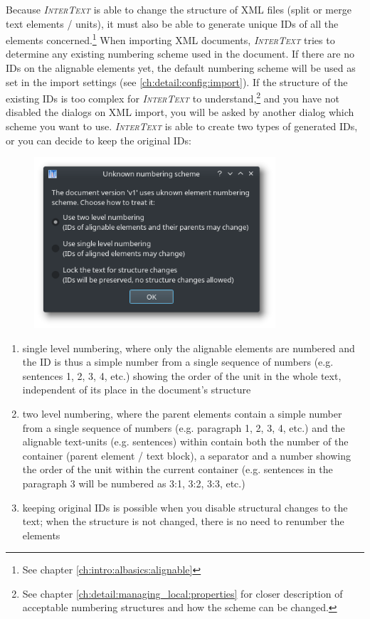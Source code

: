 \documentclass[a4paper,10pt,oneside]{book}
\newcommand{\IT}{\textit{\textsc{InterText}}\xspace}
\begin{document}
Because \IT is able to change the structure of XML files (split or merge text elements / units), it must also be able to generate unique IDs of all the elements concerned.\footnote{See chapter \ref{ch:intro:albasics:alignable}} When importing XML documents, \IT tries to determine any existing numbering scheme used in the document. If there are no IDs on the alignable elements yet, the default numbering scheme will be used as set in the import settings (see \ref{ch:detail:config:import}). If the structure of the existing IDs is too complex for \IT to understand,\footnote{See chapter \ref{ch:detail:managing_local:properties} for closer description of acceptable numbering structures and how the scheme can be changed.} and you have not disabled the dialogs on XML import, you will be asked by another dialog which scheme you want to use. \IT is able to create two types of generated IDs, or you can decide to keep the original IDs:

\begin{figure}[htb]
 \includegraphics[width=0.8\textwidth]{screenshots/numbering_dialog.png}
\end{figure}

\begin{enumerate}
 \item single level numbering, where only the alignable elements are numbered and the ID is thus a simple number from a single sequence of numbers (e.g. sentences 1, 2, 3, 4, etc.) showing the order of the unit in the whole text, independent of its place in the document's structure
 \item two level numbering, where the parent elements contain a simple number from a single sequence of numbers (e.g. paragraph 1, 2, 3, 4, etc.) and the alignable text-units (e.g. sentences) within contain both the number of the container (parent element / text block), a separator and a number showing the order of the unit within the current container (e.g. sentences in the paragraph 3 will be numbered as 3:1, 3:2, 3:3, etc.)
 \item keeping original IDs is possible when you disable structural changes to the text; when the structure is not changed, there is no need to renumber the elements
\end{enumerate}
\end{document}
